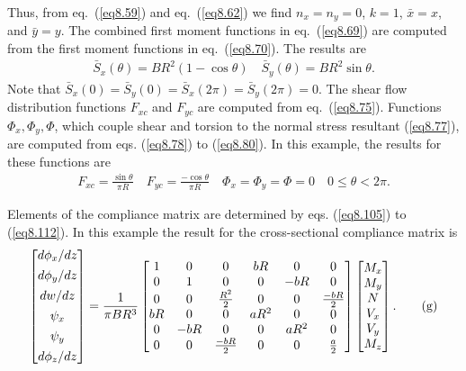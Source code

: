 \documentclass{AeroStructure-ERJohnson}
\begin{document}
\begin{example}
Thus, from eq.~(\ref{eq8.59}) and eq.~(\ref{eq8.62}) we find
$n_{x}=n_{y}=0$, $k=1$, $\bar{x}=x$, and $\bar{y}=y$. The combined
first moment functions in eq.~(\ref{eq8.69}) are computed from the
first moment functions in eq.~(\ref{eq8.70}). The results are
\begin{align}\label{ex5.3e}
\bar{S}_{x}(\theta)=B R^{2}(1-\cos \theta) \quad
\bar{S}_{y}(\theta)=B R^{2} \sin \theta.\tag{e}
\end{align}
Note that $\bar{S}_{x}(0)=\bar{S}_{y}(0)=\bar{S}_{x}(2
\pi)=\bar{S}_{y}(2 \pi)=0$. The shear flow distribution functions
$F_{xc}$ and $F_{yc}$ are computed from eq.~(\ref{eq8.75}).
Functions $\Phi_{x}, \Phi_{y}, \Phi$, which couple shear and
torsion to the normal stress resultant (\ref{eq8.77}), are
computed from eqs. (\ref{eq8.78}) to (\ref{eq8.80}). In this
example, the results for these functions are
\begin{align}\label{ex5.3f}
F_{x c}=\frac{\sin \theta}{\pi R} \quad F_{y c}=\frac{-\cos
\theta}{\pi R} \quad \Phi_{x}=\Phi_{y}=\Phi=0 \quad 0 \leq
\theta<2 \pi . \tag{f}
\end{align}
\vspace*{3pt}
\pagebreak

Elements of the compliance matrix are determined by eqs.
(\ref{eq8.105}) to (\ref{eq8.112}). In this example the result for
the cross-sectional compliance matrix is
\begin{align}\label{ex5.3g}
\left[\begin{array}{@{}c@{}}
d \phi_{x}/ d z\\
[4pt]
d \phi_{y}/ d z\\
[4pt]
d w/ d z\\
[4pt]
\psi_{x}\\
[4pt]
\psi_{y}\\
[4pt]
d \phi_{z}/ dz
\end{array}\right]=\frac{1}{\pi B
R^{3}}\left[\begin{array}{@{}cccccc@{}}1 & 0 & 0 & b R & 0 & 0\\
0
& 1 & 0 & 0 & -b R & 0\\
0 & 0 & \frac{R^{2}}{2} & 0 & 0 &
\frac{-b R}{2}\\
b R & 0 & 0 & a R^{2} & 0 & 0\\
0 & -b R & 0 & 0
& a R^{2} & 0\\
0 & 0 & \frac{-b R}{2} & 0 & 0 &
\frac{a}{2}\end{array}\right]\left[\begin{array}{@{}c@{}}M_{x}\\
M_{y}\\
N\\
V_{x}\\
V_{y}\\
M_{z}\end{array}\right].\tag{g}
\end{align}


\end{example}
\end{document}
